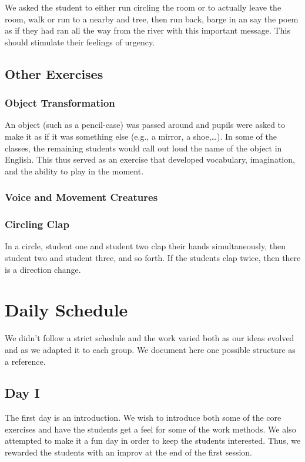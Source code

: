 \documentclass[article,twocolumn,twoside]{memoir}
\begin{document}
We asked the student to either run circling the room or to actually leave the
room, walk or run to a nearby and tree, then run back, barge in an say the poem
as if they had ran all the way from the river with this important message. This
should stimulate their feelings of urgency.

\section{Other Exercises}
\subsection{Object Transformation}
An object (such as a pencil-case) was passed around and pupils were asked to
make it as if it was something else (e.g., a mirror, a shoe,\dots). In some of
the classes, the remaining students would call out loud the name of the object
in English. This thus served as an exercise that developed vocabulary, imagination,
and the ability to play in the moment.

\subsection{Voice and Movement Creatures}
\subsection{Circling Clap}
In a circle, student one and student two clap their hands simultaneously,
then student two and student three, and so forth. If the students clap twice,
then there is a direction change.

\chapter{Daily Schedule}

We didn't follow a strict schedule and the work varied both as our ideas
evolved and as we adapted it to each group. We document here one possible
structure as a reference.

\section{Day I}
The first day is an introduction. We wish to introduce both some of the core
exercises and have the students get a feel for some of the work methods. We
also attempted to make it a fun day in order to keep the students interested.
Thus, we rewarded the students with an improv at the end of the first session.
\end{document}
